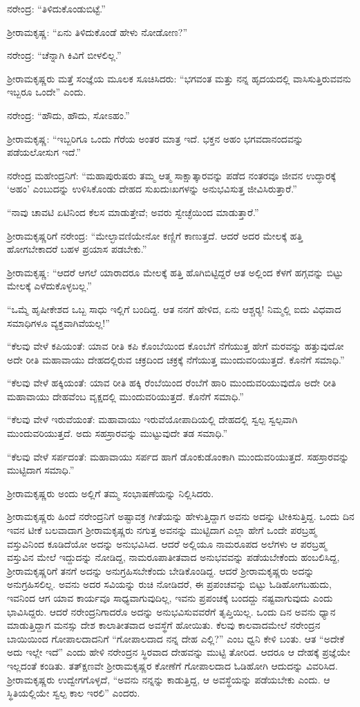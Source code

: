 ನರೇಂದ್ರ: “ತಿಳಿದುಕೊಂಡುಬಿಟ್ಟೆ.”

ಶ‍್ರೀರಾಮಕೃಷ್ಣ: “ಏನು ತಿಳಿದುಕೊಂಡೆ ಹೇಳು ನೋಡೋಣ?”

ನರೇಂದ್ರ: “ಚೆನ್ನಾಗಿ ಕಿವಿಗೆ ಬೀಳಲಿಲ್ಲ.”

ಶ‍್ರೀರಾಮಕೃಷ್ಣರು ಮತ್ತೆ ಸಂಜ್ಞೆಯ ಮೂಲಕ ಸೂಚಿಸಿದರು: “ಭಗವಂತ ಮತ್ತು ನನ್ನ ಹೃದಯದಲ್ಲಿ ವಾಸಿಸುತ್ತಿರುವವನು ಇಬ್ಬರೂ ಒಂದೇ” ಎಂದು.

ನರೇಂದ್ರ: “ಹೌದು, ಹೌದು, ಸೋಽಹಂ.”

ಶ‍್ರೀರಾಮಕೃಷ್ಣ: “ಇಬ್ಬರಿಗೂ ಒಂದು ಗೆರೆಯ ಅಂತರ ಮಾತ್ರ ಇದೆ. ಭಕ್ತನ ಅಹಂ ಭಗವದಾನಂದವನ್ನು ಪಡೆಯಲೋಸುಗ ಇದೆ.”

ನರೇಂದ್ರ ಮಹೇಂದ್ರನಿಗೆ: “ಮಹಾಪುರುಷರು ತಮ್ಮ ಆತ್ಮ ಸಾಕ್ಷಾತ್ಕಾರವನ್ನು ಪಡೆದ ನಂತರವೂ ಜೀವನ ಉದ್ಧಾರಕ್ಕೆ ‘ಅಹಂ’ ಎಂಬುದನ್ನು ಉಳಿಸಿಕೊಂಡು ದೇಹದ ಸುಖದುಃಖಗಳನ್ನು ಅನುಭವಿಸುತ್ತ ಜೀವಿಸಿರುತ್ತಾರೆ.”

“ನಾವು ಚಾವಟಿ ಏಟಿನಿಂದ ಕೆಲಸ ಮಾಡುತ್ತೇವೆ; ಅವರು ಸ್ವೇಚ್ಛೆಯಿಂದ ಮಾಡುತ್ತಾರೆ.”

ಶ‍್ರೀರಾಮಕೃಷ್ಣರಿಗೆ ನರೇಂದ್ರ: “ಮೇಲ್ಛಾವಣಿಯೇನೋ ಕಣ್ಣಿಗೆ ಕಾಣುತ್ತದೆ. ಆದರೆ ಅದರ ಮೇಲಕ್ಕೆ ಹತ್ತಿ ಹೋಗಬೇಕಾದರೆ ಬಹಳ ಪ್ರಯಾಸ ಪಡಬೇಕು.”

ಶ‍್ರೀರಾಮಕೃಷ್ಣ: “ಆದರೆ ಆಗಲೆ ಯಾರಾದರೂ ಮೇಲಕ್ಕೆ ಹತ್ತಿ ಹೊಗಿಬಿಟ್ಟಿದ್ದರೆ ಆತ ಅಲ್ಲಿಂದ ಕೆಳಗೆ ಹಗ್ಗವನ್ನು ಬಿಟ್ಟು ಮೇಲಕ್ಕೆ ಎಳೆದುಕೊಳ್ಳಬಲ್ಲ.”

“ಒಮ್ಮೆ ಹೃಷೀಕೇಶದ ಒಬ್ಬ ಸಾಧು ಇಲ್ಲಿಗೆ ಬಂದಿದ್ದ. ಆತ ನನಗೆ ಹೇಳಿದ, ಏನು ಆಶ್ಚರ‍್ಯ! ನಿಮ್ಮಲ್ಲಿ ಐದು ವಿಧವಾದ ಸಮಾಧಿಗಳೂ ವ್ಯಕ್ತವಾಗಿವೆಯಲ್ಲ!”

“ಕೆಲವು ವೇಳೆ ಕಪಿಯಂತೆ: ಯಾವ ರೀತಿ ಕಪಿ ಕೊಂಬೆಯಿಂದ ಕೊಂಬೆಗೆ ನೆಗೆಯುತ್ತ ಹೇಗೆ ಮರವನ್ನು ಹತ್ತುವುದೋ ಅದೇ ರೀತಿ ಮಹಾವಾಯು ದೇಹದಲ್ಲಿರುವ ಚಕ್ರದಿಂದ ಚಕ್ರಕ್ಕೆ ನೆಗೆಯುತ್ತ ಮುಂದುವರಿಯುತ್ತದೆ. ಕೊನೆಗೆ ಸಮಾಧಿ.”

“ಕೆಲವು ವೇಳೆ ಹಕ್ಕಿಯಂತೆ: ಯಾವ ರೀತಿ ಹಕ್ಕಿ ರೆಂಬೆಯಿಂದ ರೆಂಬೆಗೆ ಹಾರಿ ಮುಂದುವರಿಯುವುದೊ ಅದೇ ರೀತಿ ಮಹಾವಾಯು ದೇಹವೆಂಬ ವೃಕ್ಷದಲ್ಲಿ ಮುಂದುವರಿಯುತ್ತದೆ. ಕೊನೆಗೆ ಸಮಾಧಿ.”

“ಕೆಲವು ವೇಳೆ ಇರುವೆಯಂತೆ: ಮಹಾವಾಯು ಇರುವೆಯೋಪಾದಿಯಲ್ಲಿ ದೇಹದಲ್ಲಿ ಸ್ವಲ್ಪ ಸ್ವಲ್ಪವಾಗಿ ಮುಂದುವರಿಯುತ್ತದೆ. ಅದು ಸಹಸ್ರಾರವನ್ನು ಮುಟ್ಟುವುದೇ ತಡ ಸಮಾಧಿ.”

“ಕೆಲವು ವೇಳೆ ಸರ್ಪದಂತೆ: ಮಹಾವಾಯು ಸರ್ಪದ ಹಾಗೆ ಡೊಂಕುಡೊಂಕಾಗಿ ಮುಂದುವರಿಯುತ್ತದೆ. ಸಹಸ್ರಾರವನ್ನು ಮುಟ್ಟಿದಾಗ ಸಮಾಧಿ.”

ಶ‍್ರೀರಾಮಕೃಷ್ಣರು ಅಂದು ಅಲ್ಲಿಗೆ ತಮ್ಮ ಸಂಭಾಷಣೆಯನ್ನು ನಿಲ್ಲಿಸಿದರು.

ಶ‍್ರೀರಾಮಕೃಷ್ಣರು ಹಿಂದೆ ನರೇಂದ್ರನಿಗೆ ಅಷ್ಟಾವಕ್ರ ಗೀತೆಯನ್ನು ಹೇಳುತ್ತಿದ್ದಾಗ ಅವನು ಅದನ್ನು ಟೀಕಿಸುತ್ತಿದ್ದ. ಒಂದು ದಿನ ಇವನ ಟೀಕೆ ಬಲವಾದಾಗ ಶ‍್ರೀರಾಮಕೃಷ್ಣರು ನಗುತ್ತ ಅವನನ್ನು ಮುಟ್ಟಿದಾಗ ಎಲ್ಲಾ ಹೇಗೆ ಒಂದೇ ಪರಬ್ರಹ್ಮ ವಸ್ತುವಿನಿಂದ ಕೂಡಿದೆಯೋ ಅದನ್ನು ಅನುಭವಿಸಿದ. ಆದರೆ ಅಲ್ಲಿಯೂ ನಾಮರೂಪದ ಅಲೆಗಳು ಆ ಪರಬ್ರಹ್ಮ ವಸ್ತುವಿನ ಮೇಲೆ ಇದ್ದುದನ್ನು ನೋಡಿದ್ದ, ನಾಮರೂಪಾತೀತವಾದ ಅನುಭವವನ್ನು ಪಡೆಯಬೇಕೆಂದು ಹಂಬಲಿಸಿದ್ದ, ಶ‍್ರೀರಾಮಕೃಷ್ಣರಿಗೆ ತನಗೆ ಅದನ್ನು ಅನುಗ್ರಹಿಸಬೇಕೆಂದು ಬೇಡಿಕೊಂಡಿದ್ದ. ಆದರೆ ಶ‍್ರೀರಾಮಕೃಷ್ಣರು ಅದನ್ನು ಅನುಗ್ರಹಿಸಲಿಲ್ಲ. ಅವನು ಅದರ ಸವಿಯನ್ನು ರುಚಿ ನೋಡಿದರೆ, ಈ ಪ್ರಪಂಚವನ್ನು ಬಿಟ್ಟು ಓಡಿಹೋಗಬಹುದು, ಇವನಿಂದ ಆಗ ಯಾವ ಕಾರ್ಯವೂ ಸಾಧ್ಯವಾಗುವುದಿಲ್ಲ, ಇವನು ಪ್ರಪಂಚಕ್ಕೆ ಬಂದದ್ದು ನಷ್ಟವಾಗುವುದು ಎಂದು ಭಾವಿಸಿದ್ದರು. ಆದರೆ ನರೇಂದ್ರನಿಗಾದರೊ ಅದನ್ನು ಅನುಭವಿಸುವವರೆಗೆ ತೃಪ್ತಿಯಿಲ್ಲ. ಒಂದು ದಿನ ಅವನು ಧ್ಯಾನ ಮಾಡುತ್ತಿದ್ದಾಗ ಮನಸ್ಸು ದೇಶ ಕಾಲಾತೀತವಾದ ಅವಸ್ಥೆಗೆ ಹೋಯಿತು. ಕೆಲವು ಕಾಲವಾದಮೇಲೆ ನರೇಂದ್ರನ ಬಾಯಿಯಿಂದ ಗೋಪಾಲದಾದನಿಗೆ “ಗೋಪಾಲದಾದ ನನ್ನ ದೇಹ ಎಲ್ಲಿ?” ಎಂಬ ಧ್ವನಿ ಕೇಳಿ ಬಂತು. ಆತ “ಅದೇಕೆ ಅದು ಇಲ್ಲೇ ಇದೆ” ಎಂದು ಹೇಳಿ ನರೇಂದ್ರನ ಸ್ಥಿರವಾದ ದೇಹವನ್ನು ಮುಟ್ಟಿ ತೋರಿದ. ಆದರೂ ಆ ದೇಹಕ್ಕೆ ಪ್ರಜ್ಞೆಯೇ ಇಲ್ಲದಂತೆ ಕಂಡಿತು. ತತ್‍ಕ್ಷಣವೇ ಶ‍್ರೀರಾಮಕೃಷ್ಣರ ಕೋಣೆಗೆ ಗೋಪಾಲದಾದ ಓಡಿಹೋಗಿ ಆದುದನ್ನು ವಿವರಿಸಿದ. ಶ‍್ರೀರಾಮಕೃಷ್ಣರು ಉದ್ವೇಗಗೊಳ್ಳದೆ, “ಅವನು ನನ್ನನ್ನು ಕಾಡುತ್ತಿದ್ದ, ಆ ಅವಸ್ಥೆಯನ್ನು ಪಡೆಯಬೇಕು ಎಂದು. ಆ ಸ್ಥಿತಿಯಲ್ಲಿಯೇ ಸ್ವಲ್ಪ ಕಾಲ ಇರಲಿ” ಎಂದರು.

